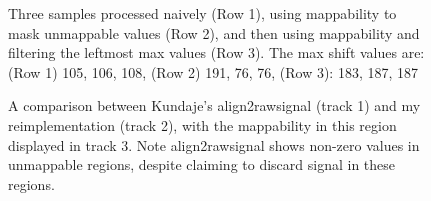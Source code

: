\documentclass[a4paper]{article}
\begin{document}
\begin{figure}[h!]
    \caption{Three samples processed naively (Row 1), using mappability to mask unmappable values (Row 2), and then using mappability and filtering the leftmost max values (Row 3). The max shift values are: (Row 1) 105, 106, 108, (Row 2) 191, 76, 76, (Row 3): 183, 187, 187}
    \label{fig:1}
  \end{figure}

  \begin{figure}[htp]

    \caption{A comparison between Kundaje's align2rawsignal (track 1) and my reimplementation (track 2), with the mappability in this region displayed in track 3. Note align2rawsignal shows non-zero values in unmappable regions, despite claiming to discard signal in these regions.}
    \label{fig:2}
  \end{figure}
\end{document}
